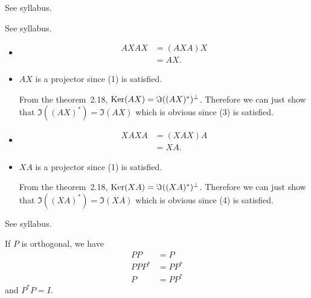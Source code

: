 \begin{solution}
  See syllabus.
\end{solution}

\begin{solution}
  See syllabus.
\end{solution}

\begin{solution}
  \begin{itemize}
    \item
      \begin{align*}
        AXAX
        & = (AXA)X\\
        & = AX.
      \end{align*}
    \item
      $AX$ is a projector since (1) is satisfied.

      From the theorem~2.18, $\operatorname{Ker}(AX) = \Im((AX)^*)^\perp$.
      Therefore we can just show that $\Im((AX)^*) = \Im(AX)$ which is obvious
      since (3) is satisfied.
    \item
      \begin{align*}
        XAXA
        & = (XAX)A\\
        & = XA.
      \end{align*}
    \item
      $XA$ is a projector since (1) is satisfied.

      From the theorem~2.18, $\operatorname{Ker}(XA) = \Im((XA)^*)^\perp$.
      Therefore we can just show that $\Im((XA)^*) = \Im(XA)$ which is obvious
      since (4) is satisfied.
  \end{itemize}
\end{solution}

\begin{solution}
  See syllabus.

  If $P$ is orthogonal, we have
  \begin{align*}
    PP & = P\\
    PPP^* & = PP^*\\
    P & = PP^*
  \end{align*}
  and $P^*P = I$.
\end{solution}

\nosolution

\nosolution

\nosolution
